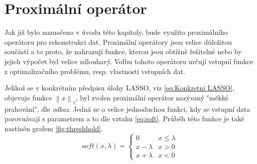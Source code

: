 \documentclass[FM,BP]{tulthesis}
\newcounter{Vzorce}
\begin{document}
\section{Proximální operátor}
Jak již bylo naznačeno v úvodu této kapitoly, bude využito proximálního operátoru pro rekonstrukci dat. Proximální operátory jsou velice důležitou součástí a to proto, že nahrazují funkce, kterou jsou obtížně řešitelné nebo by jejich výpočet byl velice zdlouhavý. Volbu tohoto operátoru určují vstupní funkce z optimalizačního problému, resp. vlastnosti vstupních dat. 

Jelikož se v konkrétním předpisu úlohy LASSO, viz \ref{eq:Konkretni LASSO}, objevuje funkce $\left\| x\right\| _1$, byl zvolen proximální operátor nazývaný "měkké prahování", dle \textit{odkaz}. Jedná se o velice jednoduchou funkci, kdy se vstupní data porovnávají s parametrem a to dle vztahu \ref{eq:soft}. Průběh této funkce je také nastíněn grafem \ref{fig:threshhold}.
\begin{equation} \label{eq:soft} \tag{Vzorec \theVzorce}
soft(x, \lambda) = \begin{cases}
0  & x \leq \lambda\\
x - \lambda & x > 0\\
x + \lambda & x < 0
\end{cases}
\end{equation}
 
\end{document}
